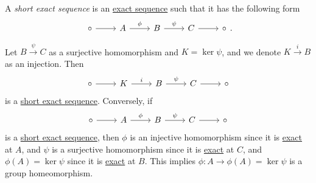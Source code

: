 \begin{definition}\label{def:short-exact-sequence}
	A \emph{short exact sequence} is an \hyperref[def:exact-sequence]{exact sequence} such that it has the following form
	\[
		\begin{tikzcd}
			\circ & A & B & C & \circ
			\arrow["\phi", from=1-2, to=1-3]
			\arrow["\psi", from=1-3, to=1-4]
			\arrow[from=1-1, to=1-2]
			\arrow[from=1-4, to=1-5]
		\end{tikzcd}.
	\]
\end{definition}

\begin{remark}
	Let \(B \overset{\psi}{\longrightarrow} C\) as a surjective homomorphism and \(K = \ker  \psi \), and we denote \(K \overset{i}{\longrightarrow}B \) as an injection. Then
	\[
		\begin{tikzcd}
			\circ & K & B & C & \circ
			\arrow["i", from=1-2, to=1-3]
			\arrow["\psi", from=1-3, to=1-4]
			\arrow[from=1-1, to=1-2]
			\arrow[from=1-4, to=1-5]
		\end{tikzcd}
	\]
	is a \hyperref[def:short-exact-sequence]{short exact sequence}. Conversely, if
	\[
		\begin{tikzcd}
			\circ & A & B & C & \circ
			\arrow["\phi ", from=1-2, to=1-3]
			\arrow["\psi", from=1-3, to=1-4]
			\arrow[from=1-1, to=1-2]
			\arrow[from=1-4, to=1-5]
		\end{tikzcd}
	\]
	is a \hyperref[def:short-exact-sequence]{short exact sequence}, then \(\phi \) is an injective homomorphism since it is \hyperref[def:apx:exact]{exact} at \(A\),
	and \(\psi \) is a surjective homomorphism since it is \hyperref[def:apx:exact]{exact} at \(C\), and \(\phi (A) = \ker \psi\) since it is \hyperref[def:apx:exact]{exact} at \(B\).
	This implies \(\phi \colon A\to \phi (A) = \ker  \psi \) is a group homeomorphism.
\end{remark}

